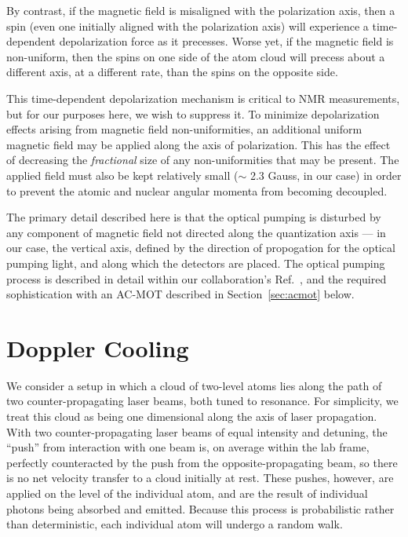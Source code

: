 By contrast, if the magnetic field is misaligned with the polarization axis, then a spin (even one initially aligned with the polarization axis) will experience a time-dependent depolarization force as it precesses.  Worse yet, if the magnetic field is non-uniform, then the spins on one side of the atom cloud will precess about a different axis, at a different rate, than the spins on the opposite side.  

This time-dependent depolarization mechanism is critical to \ac{NMR} measurements, but for our purposes here, we wish to suppress it.  To minimize depolarization effects arising from magnetic field non-uniformities, an additional uniform magnetic field may be applied along the axis of polarization.  This has the effect of decreasing the \emph{fractional} size of any non-uniformities that may be present.  The applied field must also be kept relatively small ($\sim$ 2.3 Gauss, in our case) in order to prevent the atomic and nuclear angular momenta from becoming decoupled.  






\color{skyblue}
The primary detail described here is that the optical pumping is disturbed by any component of magnetic field not directed along the quantization axis --- in our case, the vertical axis, defined by the direction of propogation for the optical pumping light, and along which the detectors are placed.  The optical pumping process is described in detail within our collaboration's Ref.~\cite{ben_OP}, and the required sophistication with an AC-MOT described in Section~\ref{sec:acmot} below.
\color{black}





\section{Doppler Cooling}
\label{sec:dopplercooling}
We consider a setup in which a cloud of two-level atoms lies along the path of two counter-propagating laser beams, both tuned to
resonance.  For simplicity, we treat this cloud as being one dimensional along the axis of laser propagation.  
With two counter-propagating laser beams of equal intensity and detuning,
the ``push'' from interaction with one beam is, on average within the lab frame, perfectly counteracted by the push from the opposite-propagating beam, so there is no net velocity transfer to a cloud initially at rest.  These pushes, however, are applied on the level of the individual atom, and are the result of individual photons being absorbed and emitted.  Because this process is probabilistic rather than deterministic, each individual atom will undergo a random walk.  

